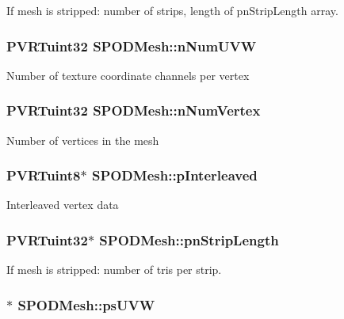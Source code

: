If mesh is stripped\+: number of strips, length of pn\+Strip\+Length array. \hypertarget{struct_s_p_o_d_mesh_a332be519b8d43b651c1baffb975c4046}{
\subsubsection[{n\+Num\+U\+V\+W}]{\setlength{\rightskip}{0pt plus 5cm}P\+V\+R\+Tuint32 S\+P\+O\+D\+Mesh\+::n\+Num\+U\+V\+W}}\label{struct_s_p_o_d_mesh_a332be519b8d43b651c1baffb975c4046}
Number of texture coordinate channels per vertex \hypertarget{struct_s_p_o_d_mesh_a4e4b29465b82a7fcbba6c7bb2c585778}{
\subsubsection[{n\+Num\+Vertex}]{\setlength{\rightskip}{0pt plus 5cm}P\+V\+R\+Tuint32 S\+P\+O\+D\+Mesh\+::n\+Num\+Vertex}}\label{struct_s_p_o_d_mesh_a4e4b29465b82a7fcbba6c7bb2c585778}
Number of vertices in the mesh \hypertarget{struct_s_p_o_d_mesh_acadf879e8f994efe0c0363a652220c6c}{
\subsubsection[{p\+Interleaved}]{\setlength{\rightskip}{0pt plus 5cm}P\+V\+R\+Tuint8$\ast$ S\+P\+O\+D\+Mesh\+::p\+Interleaved}}\label{struct_s_p_o_d_mesh_acadf879e8f994efe0c0363a652220c6c}
Interleaved vertex data \hypertarget{struct_s_p_o_d_mesh_abde986b8c84b9e7b7f3f3c28b78e8274}{
\subsubsection[{pn\+Strip\+Length}]{\setlength{\rightskip}{0pt plus 5cm}P\+V\+R\+Tuint32$\ast$ S\+P\+O\+D\+Mesh\+::pn\+Strip\+Length}}\label{struct_s_p_o_d_mesh_abde986b8c84b9e7b7f3f3c28b78e8274}
If mesh is stripped\+: number of tris per strip. \hypertarget{struct_s_p_o_d_mesh_aa19d85b4e581db09dc78322d06af2280}{
\subsubsection[{ps\+U\+V\+W}]{$\ast$ S\+P\+O\+D\+Mesh\+::ps\+U\+V\+W}}\label{struct_s_p_o_d_mesh_aa19d85b4e581db09dc78322d06af2280}
